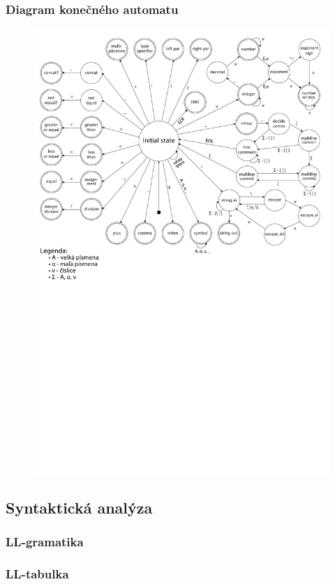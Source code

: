 \documentclass[11pt,a4paper]{article}
\begin{document}
        \subsubsection{Diagram konečného automatu}
        \begin{figure}
            \centering
            \includegraphics[scale=0.37]{images/FSM_v5.pdf}
        \end{figure}
    \subsection{Syntaktická analýza}
        \subsubsection{LL-gramatika}
        \subsubsection{LL-tabulka}
\end{document}
